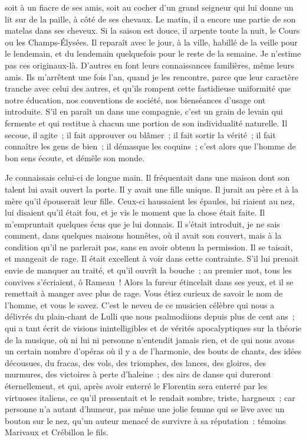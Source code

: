\documentclass[french,twoside]{book} %
\begin{document}
soit à un fiacre de ses amis, soit au cocher d’un grand seigneur qui lui donne un lit sur de la paille, à côté de ses chevaux. Le matin, il a encore une partie de son matelas dans ses cheveux. Si la saison est douce, il arpente toute la nuit, le Cours ou les Champs-Élysées. Il reparaît avec le jour, à la ville, habillé de la veille pour le lendemain, et du lendemain quelquefois pour le reste de la semaine. Je n’estime pas ces originaux-là. D’autres en font leurs connaissances familières, même leurs amis. Ils m’arrêtent une fois l’an, quand je les rencontre, parce que leur caractère tranche avec celui des autres, et qu’ils rompent cette fastidieuse uniformité que notre éducation, nos conventions de société, nos bienséances d’usage ont introduite. S’il en paraît un dans une compagnie, c’est un grain de levain qui fermente et qui restitue à chacun une portion de son individualité naturelle. Il secoue, il agite ; il fait approuver ou blâmer ; il fait sortir la vérité ; il fait connaître les gens de bien ; il démasque les coquins ; c’est alors que l’homme de bon sens écoute, et démêle son monde.\par
Je connaissais celui-ci de longue main. Il fréquentait dans une maison dont son talent lui avait ouvert la porte. Il y avait une fille unique. Il jurait au père et à la mère qu’il épouserait leur fille. Ceux-ci haussaient les épaules, lui riaient au nez, lui disaient qu’il était fou, et je vis le moment que la chose était faite. Il m’empruntait quelques écus que je lui donnais. Il s’était introduit, je ne sais comment, dans quelques maisons honnêtes, où il avait son couvert, mais à la condition qu’il ne parlerait pas, sans en avoir obtenu la permission. Il se taisait, et mangeait de rage. Il était excellent à voir dans cette contrainte. S’il lui prenait envie de manquer au traité, et qu’il ouvrît la bouche ; au premier mot, tous les convives s’écriaient, ô Rameau ! Alors la fureur étincelait dans ses yeux, et il se remettait à manger avec plus de rage. Vous étiez curieux de savoir le nom de l’homme, et vous le savez. C’est le neveu de ce musicien célèbre qui nous a délivrés du plain-chant de Lulli que nous psalmodiions depuis plus de cent ans ; qui a tant écrit de visions inintelligibles et de vérités apocalyptiques sur la théorie de la musique, où ni lui ni personne n’entendit jamais rien, et de qui nous avons un certain nombre d’opéras où il y a de l’harmonie, des bouts de chants, des idées décousues, du fracas, des vols, des triomphes, des lances, des gloires, des murmures, des victoires à perte d’haleine ; des airs de danse qui dureront éternellement, et qui, après avoir enterré le Florentin sera enterré par les virtuoses italiens, ce qu’il pressentait et le rendait sombre, triste, hargneux ; car personne n’a autant d’humeur, pas même une jolie femme qui se lève avec un bouton sur le nez, qu’un auteur menacé de survivre à sa réputation : témoins Marivaux et Crébillon le fils.\par
\end{document}
